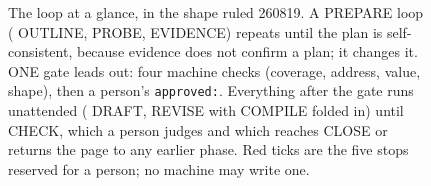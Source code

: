 \begin{figure}[t]
  \centering
  
  \caption{The loop at a glance, in the shape ruled 260819. A PREPARE loop
  ( OUTLINE,  PROBE,  EVIDENCE) repeats until the
  plan is self-consistent, because evidence does not confirm a plan; it changes
  it. ONE gate leads out: four machine checks (coverage, address, value, shape),
  then a person's \texttt{approved:}. Everything after the gate runs unattended
  ( DRAFT,  REVISE with  COMPILE folded in) until
   CHECK, which a person judges and which reaches CLOSE or returns
  the page to any earlier phase. Red ticks are the five stops reserved for a
  person; no machine may write one.}
  \label{fig:qpw00-loop-at-a-glance}
\end{figure}
